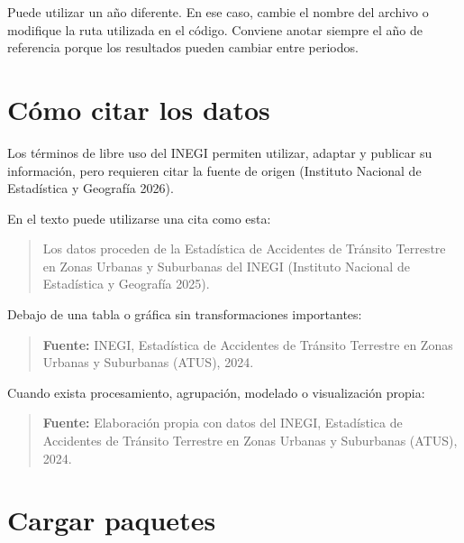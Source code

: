 \documentclass[
  spanish,
  10.5pt,
  letterpaper,
  openany,
  headings=big]{scrbook}
\begin{document}
\begin{tcolorbox}[enhanced jigsaw, arc=.35mm, bottomrule=.15mm, bottomtitle=1mm, breakable, colback=white, colbacktitle=quarto-callout-tip-color!10!white, colframe=quarto-callout-tip-color-frame, coltitle=black, left=2mm, leftrule=.75mm, opacityback=0, opacitybacktitle=0.6, rightrule=.15mm, title=\textcolor{quarto-callout-tip-color}{\faLightbulb}\hspace{0.5em}{Otro año de información}, titlerule=0mm, toprule=.15mm, toptitle=1mm]

Puede utilizar un año diferente. En ese caso, cambie el nombre del
archivo o modifique la ruta utilizada en el código. Conviene anotar
siempre el año de referencia porque los resultados pueden cambiar entre
periodos.

\end{tcolorbox}

\section{Cómo citar los datos}\label{cuxf3mo-citar-los-datos}

Los términos de libre uso del INEGI permiten utilizar, adaptar y
publicar su información, pero requieren citar la fuente de origen
(Instituto Nacional de Estadística y Geografía 2026).

En el texto puede utilizarse una cita como esta:

\begin{quote}
Los datos proceden de la Estadística de Accidentes de Tránsito Terrestre
en Zonas Urbanas y Suburbanas del INEGI (Instituto Nacional de
Estadística y Geografía 2025).
\end{quote}

Debajo de una tabla o gráfica sin transformaciones importantes:

\begin{quote}
\textbf{Fuente:} INEGI, Estadística de Accidentes de Tránsito Terrestre
en Zonas Urbanas y Suburbanas (ATUS), 2024.
\end{quote}

Cuando exista procesamiento, agrupación, modelado o visualización
propia:

\begin{quote}
\textbf{Fuente:} Elaboración propia con datos del INEGI, Estadística de
Accidentes de Tránsito Terrestre en Zonas Urbanas y Suburbanas (ATUS),
2024.
\end{quote}

\section{Cargar paquetes}\label{cargar-paquetes}
\end{document}

